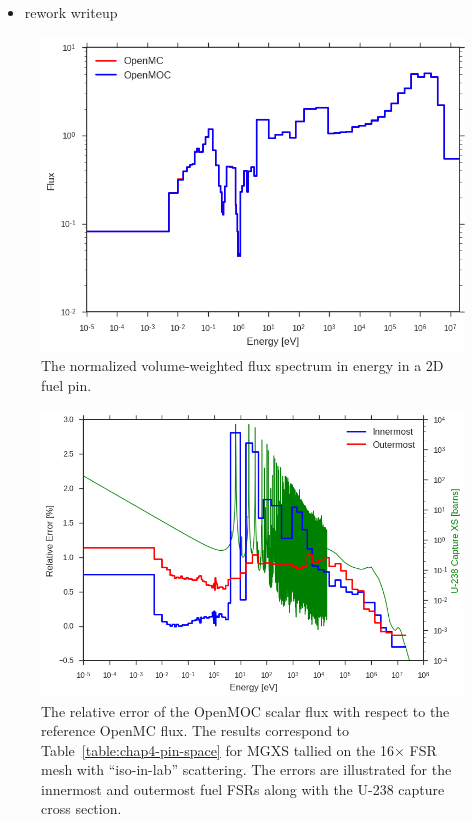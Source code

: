 \begin{itemize}[noitemsep]
  \item rework writeup
\end{itemize}

\begin{figure}[h!]
  \centering
  \includegraphics[width=0.9\linewidth]{figures/biases/pin-cell/vol-avg-flux}
\caption[Flux spectrum in a 2D fuel pin.]{The normalized volume-weighted flux spectrum in energy in a 2D fuel pin.}
\label{fig:chap4-pin-flux}
\end{figure}

\begin{figure}[H]
  \centering
  \includegraphics[width=0.85\linewidth]{figures/biases/pin-cell/rel-err-inner-outer}
\caption[Flux relative error by group for a 2D fuel pin.]{The relative error of the OpenMOC scalar flux with respect to the reference OpenMC flux. The results correspond to Table~\ref{table:chap4-pin-space} for \ac{MGXS} tallied on the 16$\times$ \ac{FSR} mesh with ``iso-in-lab'' scattering. The errors are illustrated for the innermost and outermost fuel \ac{FSR}s along with the U-238 capture cross section.}
\label{fig:chap4-pin-rel-err}
\end{figure}

